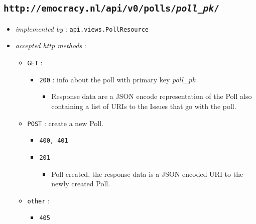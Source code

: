 \documentclass[a4paper]{report}
\begin{document}
\subsection{\texttt{http://emocracy.nl/api/v0/polls/\emph{poll\_pk}/}}
\begin{itemize}
    \item{\textsl{implemented by} : \texttt{api.views.PollResource}}
    \item{\textsl{accepted http methods} :
        \begin{itemize}
            \item{\texttt{GET} :
                \begin{itemize}
                    \item{\texttt{200} : info about the poll with primary key \emph{poll\_pk}
                    \begin{itemize}
                        \item{Response data are a JSON encode representation of
                        the Poll also containing a list of URIs to the Issues 
                        that go with the poll.}
                    \end{itemize}                    
                    }
                \end{itemize}
            }
            \item{\texttt{POST} : create a new Poll.
                \begin{itemize}
                    \item{\texttt{400, 401}}
                    \item{\texttt{201}
                        \begin{itemize}
                            \item{Poll created, the response data is a JSON 
                            encoded URI to the newly created Poll.}
                        \end{itemize}
                    }
                \end{itemize}
            }
            
            \item{\texttt{other} :
                \begin{itemize}
                    \item{\texttt{405}}
                \end{itemize}
            }
        \end{itemize}
    }
\end{itemize}
\end{document}
